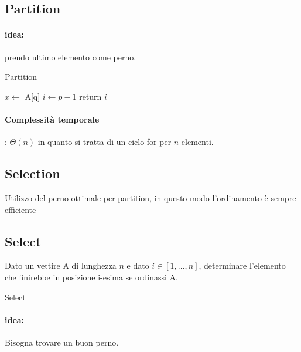 \documentclass{article}
\begin{document}
\hypertarget{partition}{\subsection{Partition}} %
\paragraph{idea:} prendo ultimo elemento come perno. 

\begin{algorithm}[H]
\caption{Partition}
$x \leftarrow$ A[q] \;
$i \leftarrow p-1$\;
    return $i$\;

\end{algorithm}

\paragraph{Complessità temporale}: $\Theta(n)$ in quanto si tratta di un ciclo for per $n$ elementi.

\hypertarget{selection}{}\subsection{Selection} %
Utilizzo del perno ottimale per partition, in questo modo l'ordinamento è sempre efficiente


\hypertarget{select}{}\subsection{Select} %
Dato un vettire A di lunghezza $n$ e dato $i \in [1,...,n]$, determinare l'elemento che finirebbe in posizione i-esima se ordinassi A. 

\begin{algorithm}[H]
\caption{Select}
\end{algorithm}
\paragraph{idea:} Bisogna trovare un buon perno.
\end{document}
